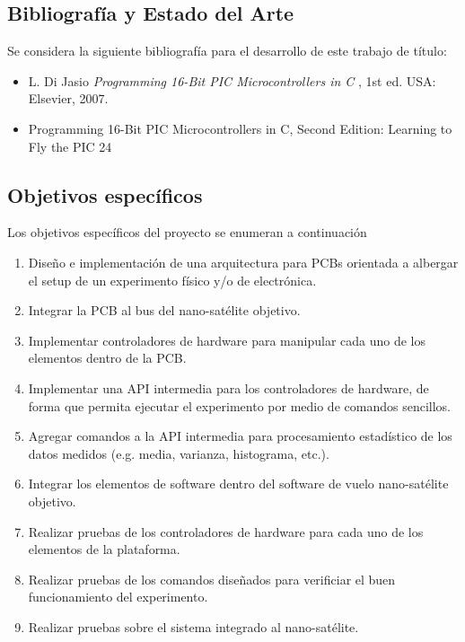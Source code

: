 \documentclass[11pt,letterpaper]{article}
\begin{document}
\subsection{Bibliografía y Estado del Arte}

Se considera la siguiente bibliografía para el desarrollo de este trabajo de título:

\begin{itemize}
	\item L. Di Jasio \textit{Programming 16-Bit PIC Microcontrollers in C} , 1st ed. USA: Elsevier, 2007.
	\item Programming 16-Bit PIC Microcontrollers in C, Second Edition: Learning to Fly the PIC 24
\end{itemize}

\subsection{Objetivos específicos}

Los objetivos específicos del proyecto se enumeran a continuación

\begin{enumerate}
 \item Diseño e implementación de una arquitectura para PCBs orientada a albergar el setup de un experimento físico y/o de electrónica.
 \item Integrar la PCB al bus del nano-sat\'elite objetivo.
 \item Implementar controladores de hardware para manipular cada uno de los elementos dentro de la PCB.
 \item Implementar una API intermedia para los controladores de hardware, de forma que permita ejecutar el experimento por medio de comandos sencillos.
 \item Agregar comandos a la API intermedia para procesamiento estadístico de los datos medidos (e.g. media, varianza, histograma, etc.).
 \item Integrar los elementos de software dentro del software de vuelo nano-sat\'elite objetivo.
 \item Realizar pruebas de los controladores de hardware para cada uno de los elementos de la plataforma.
 \item Realizar pruebas de los comandos diseñados para verificiar el buen funcionamiento del experimento.
 \item Realizar pruebas sobre el sistema integrado al nano-sat\'elite.

\end{enumerate}
\end{document}
